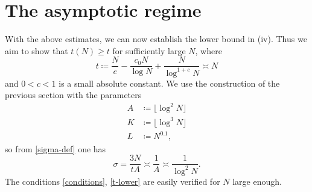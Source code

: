 \documentclass[10pt,a4paper,reqno]{amsart}
\numberwithin{equation}{section}
\theoremstyle{plain}
\theoremstyle{definition}
\begin{document}
\section{The asymptotic regime}

With the above estimates, we can now establish the lower bound in (iv).  Thus we aim to show that $t(N) \geq t$ for sufficiently large $N$, where
\begin{equation}\label{main-lower}
   t \coloneqq \frac{N}{e} - \frac{c_0 N}{\log N} + \frac{N}{\log^{1+c} N} \asymp N
\end{equation}
and $0 < c < 1$ is a small absolute constant. We use the construction of the previous section with the parameters
\begin{align}
  A &\coloneqq \lfloor \log^2 N \rfloor\label{a-asym}\\
K &\coloneqq \lfloor \log^3 N \rfloor \label{k-asym} \\
L &\coloneqq N^{0.1},\label{l-asym}
\end{align}
so from \eqref{sigma-def} one has
\begin{equation}\label{sigma-alt}
   \sigma = \frac{3N}{tA} \asymp \frac{1}{A} \asymp \frac{1}{\log^2 N}.
\end{equation}
The conditions \eqref{conditions}, \eqref{t-lower} are easily verified for $N$ large enough.
\end{document}
